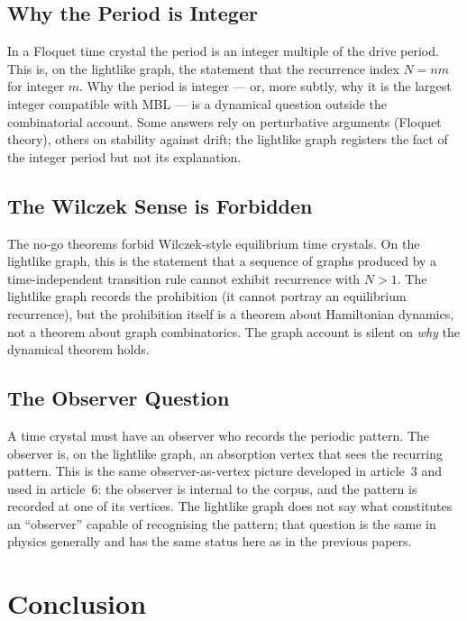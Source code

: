 \documentclass[11pt]{article}
\begin{document}
\subsection{Why the Period is Integer}

In a Floquet time crystal the period is an integer multiple of the drive period. This is, on the lightlike graph, the statement that the recurrence index $N = nm$ for integer $m$. Why the period is integer --- or, more subtly, why it is the largest integer compatible with MBL --- is a dynamical question outside the combinatorial account. Some answers rely on perturbative arguments (Floquet theory), others on stability against drift; the lightlike graph registers the fact of the integer period but not its explanation.

\subsection{The Wilczek Sense is Forbidden}

The no-go theorems forbid Wilczek-style equilibrium time crystals. On the lightlike graph, this is the statement that a sequence of graphs produced by a time-independent transition rule cannot exhibit recurrence with $N > 1$. The lightlike graph records the prohibition (it cannot portray an equilibrium recurrence), but the prohibition itself is a theorem about Hamiltonian dynamics, not a theorem about graph combinatorics. The graph account is silent on \emph{why} the dynamical theorem holds.

\subsection{The Observer Question}

A time crystal must have an observer who records the periodic pattern. The observer is, on the lightlike graph, an absorption vertex that sees the recurring pattern. This is the same observer-as-vertex picture developed in article~3 and used in article~6: the observer is internal to the corpus, and the pattern is recorded at one of its vertices. The lightlike graph does not say what constitutes an ``observer'' capable of recognising the pattern; that question is the same in physics generally and has the same status here as in the previous papers.

\section{Conclusion}
\label{sec:conclusion}
\end{document}
